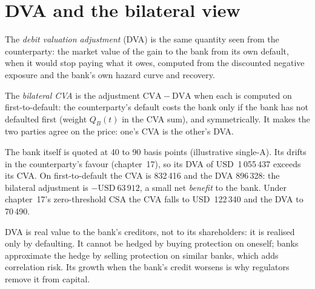 \label{lst:rc:credit-and-debit-valuation-adjustments:cva}

\section{DVA and the bilateral view}

\begin{definition}\label{def:rc:credit-and-debit-valuation-adjustments:dva}
The \emph{debit valuation adjustment} (DVA) is the same
quantity seen from the counterparty: the market value of the gain to the bank from its own
default, when it would stop paying what it owes, computed from the discounted negative
exposure and the bank's own hazard curve and recovery.
\end{definition}

\begin{definition}\label{def:rc:credit-and-debit-valuation-adjustments:bcva}
The \emph{bilateral CVA} is the adjustment $\mathrm{CVA}-\mathrm{DVA}$ when each is
computed on first-to-default: the counterparty's default costs the bank only if the bank
has not defaulted first (weight $Q_B(t)$ in the CVA sum), and symmetrically. It makes the two
parties agree on the price: one's CVA is the other's DVA.
\end{definition}

\begin{example}\label{ex:rc:credit-and-debit-valuation-adjustments:bcva}
The bank itself is quoted at 40 to 90 basis points (illustrative single-A). Its 
drifts in the counterparty's favour (chapter~17), so its DVA of USD~1\,055\,437 exceeds its CVA.
On first-to-default the CVA is 832\,416 and the DVA 896\,328: the bilateral adjustment is
$-\text{USD}~63\,912$, a small net \emph{benefit} to the bank. Under chapter~17's zero-threshold CSA
the CVA falls to USD~122\,340 and the DVA to 70\,490.
\end{example}

\begin{remark}\label{rem:rc:credit-and-debit-valuation-adjustments:dva}
DVA is real value to the bank's creditors, not to its shareholders: it is realised only by
defaulting. It cannot be hedged by buying protection on oneself; banks approximate the hedge
by selling protection on similar banks, which adds correlation risk. Its growth when the bank's
credit worsens is why regulators remove it from capital.
\end{remark}

